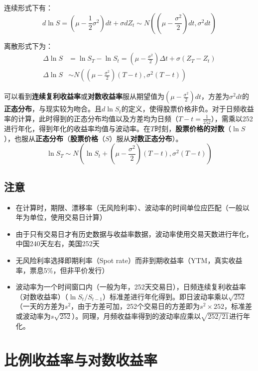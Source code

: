 \documentclass[11pt]{article}
\begin{document}
连续形式下有：
\begin{equation*}
    d\ln S = \left( \mu - \frac{1}{2}\sigma^2\right) dt + \sigma dZ_t \sim N \left( (\mu-\frac{\sigma^2}{2})dt, \sigma^2 dt \right)
\end{equation*}

离散形式下为：
\begin{align*}
    \Delta \ln S &= \ln S_T - \ln S_t = \left( \mu - \frac{\sigma^2}{2} \right) \Delta t + \sigma (Z_T - Z_t) \\
    \Delta \ln S &\sim N \left((\mu-\frac{\sigma^2}{2})(T-t), \sigma^2(T-t) \right)
\end{align*}

可以看到\textbf{连续复利收益率}或\textbf{对数收益率}服从期望值为$(\mu - \tfrac{\sigma^2}{2})dt$，方差为$\sigma^2 dt$的\textbf{正态分布}，与现实较为吻合。且$d\ln S_t$的定义，使得股票价格非负。对于日频收益率的计算，此时得到的正态分布均值以及方差均为日频（$T-t=\frac{1}{252}$），需乘以252进行年化，得到年化的收益率均值与波动率。在$T$时刻，\textbf{股票价格的对数}（$\ln S$），也服从\textbf{正态分布}（\textbf{股票价格}（$S$）服从\textbf{对数正态分布}）。
\begin{equation*}
    \ln S_T  \sim N \left(\ln S_t + (\mu-\frac{\sigma^2}{2})(T-t), \sigma^2(T-t)\right)
\end{equation*}

\subsection{注意}

\begin{itemize}
    \setlength{\itemsep}{0em}
    \item 在计算时，期限、漂移率（无风险利率）、波动率的时间单位应匹配（一般以年为单位，使用交易日计算）
    \item 由于只有交易日才有历史数据与收益率数据，波动率使用交易天数进行年化，中国240天左右，美国252天
    \item 无风险利率选择即期利率（Spot rate）而非到期收益率（YTM，真实收益率，票息5\%，但非平价发行）
    \item 波动率为一个时间窗口内（一般为年，252天交易日），日频连续复利收益率（对数收益率）（$\ln S_t/S_{t-1}$）标准差进行年化得到。即日波动率乘以$\sqrt{252}$（一天的方差为$s^2$，由于方差可加，252个交易日的方差即为$s^2 \times 252$，标准差或波动率为$s\sqrt{252}$）。同理，月频收益率得到的波动率应乘以$\sqrt{252/21}$进行年化。
\end{itemize}

\section{比例收益率与对数收益率}
\end{document}
